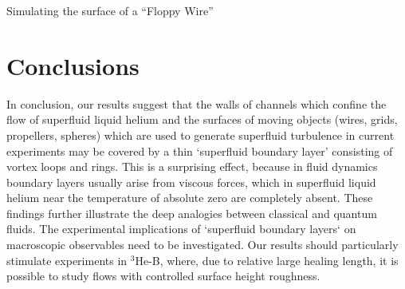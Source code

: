 \begin{chapter}{\label{cha:afm}Simulating the surface of a ``Floppy Wire''}


\section{Conclusions}
In conclusion, our results suggest that the walls of channels which
confine the flow of superfluid liquid helium and the surfaces of moving
objects (wires, grids, propellers, spheres) which are used
to generate superfluid turbulence in current experiments
may be covered by a thin `superfluid boundary layer' consisting of 
vortex loops and rings.  This is a surprising effect, because
in fluid dynamics boundary layers usually arise from viscous forces, 
which in superfluid liquid helium near the temperature of
absolute zero are completely absent.  These findings further illustrate the deep analogies between classical and quantum fluids.
The experimental implications of `superfluid boundary layers` on macroscopic
observables need to be investigated.  Our results should
particularly stimulate experiments in $^3$He-B, where, due to relative
large healing length, it is possible to study flows with controlled 
surface height roughness. 

\end{chapter}
